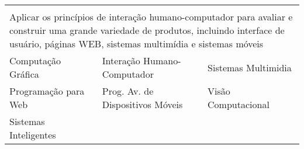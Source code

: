 \begin{longtable}{|p{}p{}p{}|}
    \multicolumn{3}{p{0.95\textwidth}}{}\\
    \multicolumn{3}{p{0.95\textwidth}}{Aplicar os princípios de interação
    humano-computador para avaliar e construir uma grande variedade de
    produtos, incluindo interface de usuário, páginas WEB, sistemas multimídia
    e sistemas móveis}\\
    \hline
    \textcolor{nblue}{Computação Gráfica} & 
    \textcolor{nblue}{\small Interação Humano-Computador} &
    \textcolor{nyellow}{Sistemas Multimidia}\\
    \textcolor{nyellow}{Programação para Web} &
    \textcolor{nyellow}{\small Prog. Av. de Dispositivos Móveis} & 
    \textcolor{nyellow}{Visão Computacional}\\
    \textcolor{nyellow}{Sistemas Inteligentes} & & \\
    \hline
    
\end{longtable}
